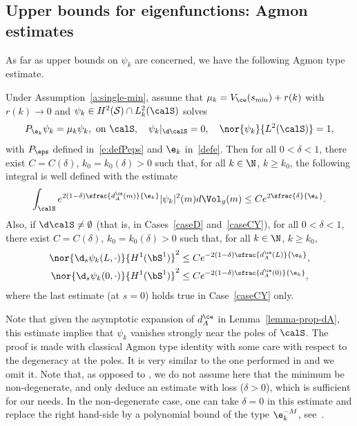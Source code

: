 \subsection{Upper bounds for eigenfunctions: Agmon estimates}
\label{s:surf-Agmon}
As far as upper bounds on $\psi_k$ are concerned, we have the following Agmon type estimate.
\begin{proposition}
\label{p:Agmon-revolution}
Under Assumption~\ref{a:single-min}, assume that $\mu_k = V_\ce(s_{\min}) +r(k)$ with $r(k)\to 0$ and $\psi_k \in H^2 (\mathcal{S})\cap L^2_k(\calS)$ solves
\[
P_{\e_k}\psi_k=\mu_k \psi_k, \text{ on } \calS, \quad \psi_k|_{\d\calS} = 0,\quad \nor{\psi_k}{L^2(\calS)}=1,
\]
with $P_\eps$ defined in~\eqref{e:defPeps} and $\e_k$ in~\eqref{defe}. Then for all $0<\delta< 1$, there exist $C=C(\delta)$, $k_0=k_0(\delta)>0$ such that, for all $k \in \N$, $k \geq k_0$, the following integral is well defined with the estimate
\[
\int_{\calS} e^{2(1-\delta)\sfrac{ d_A^{\ce}(m)}{\e_k}} |\psi_k|^2(m) d\Vol_g(m)
\leq C e^{2\sfrac{\delta}{\e_k}}.
\]
Also, if $\d\calS \neq \emptyset$ (that is, in Cases~\ref{caseD} and~\ref{caseCY}), for all $0<\delta< 1$, there exist $C=C(\delta)$, $k_0=k_0(\delta)>0$ such that, for all $k \in \N$, $k \geq k_0$,
\begin{equation}
\label{e:estimate-psik-bord}
\begin{split}
\nor{\d_s \psi_k(L,\cdot)}{H^1(\bS^1)}^2
&\leq C e^{- 2(1-\delta)\sfrac{ d_A^{\ce}(L)}{\e_k}}, \\
\nor{\d_s \psi_k(0,\cdot)}{H^1(\bS^1)}^2
&\leq C e^{- 2(1-\delta)\sfrac{ d_A^{\ce}(0)}{\e_k}},
\end{split}
\end{equation}
where the last estimate (at $s=0$) holds true in Case~\ref{caseCY} only.
\end{proposition}
Note that given the asymptotic expansion of $d_A^{\ce}$ in Lemma~\ref{lemma-prop-dA}, this estimate implies that $\psi_k$ vanishes strongly near the poles of $\calS$.
The proof is made with classical Agmon type identity with some care with respect to the degeneracy at the poles. It is very similar to the one performed in \cite[Th.\,3.9]{LL:18} and we omit it. Note that, as opposed to \cite[Th.\,3.9]{LL:18}, we do not assume here that the minimum be non-degenerate, and only deduce an estimate with loss ($\delta>0$), which is sufficient for our needs. In the non-degenerate case, one can take $\delta=0$ in this estimate and replace the right hand-side by a polynomial bound of the type $\e_k^{-M}$, see~\cite[Th.\,3.9]{LL:18}.

